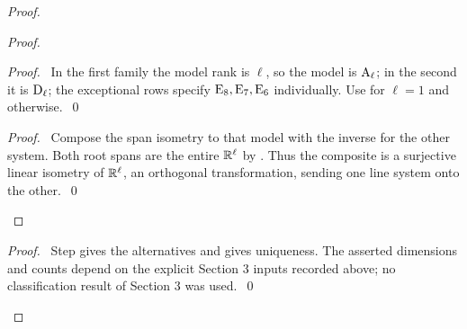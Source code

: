 \begin{proof}
 \begin{proof}
  \begin{proof}
   \pf\ In the first family the model rank is $\ell$, so the model is $\mathrm{A}_\ell$;
   in the second it is $\mathrm{D}_\ell$; the exceptional rows specify $\mathrm{E}_8,\mathrm{E}_7,\mathrm{E}_6$ individually.
   Use  for $\ell=1$ and  otherwise.~\qed
  \end{proof}
  \qedstep
  \begin{proof}
   \pf\ Compose the span isometry to that model with the inverse for the other system.
   Both root spans are the entire ${\mathbb R}^\ell$ by . Thus the composite is a
   surjective linear isometry of ${\mathbb R}^\ell$, an orthogonal transformation, sending one
   line system onto the other.~\qed
  \end{proof}
 \end{proof}
 \qedstep
 \begin{proof}
  \pf\ Step  gives the alternatives and  gives
  uniqueness. The asserted dimensions and counts depend on the explicit Section 3 inputs
  recorded above; no classification result of Section 3 was used.~\qed
 \end{proof}
\end{proof}
